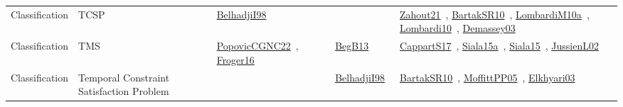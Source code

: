 {\begin{longtable}{lp{3cm}>{\raggedright\arraybackslash}p{6cm}>{\raggedright\arraybackslash}p{6cm}>{\raggedright\arraybackslash}p{8cm}}
Classification & TCSP & \href{../works/BelhadjiI98.pdf}{BelhadjiI98}~\cite{BelhadjiI98} &  & \href{../works/Zahout21.pdf}{Zahout21}~\cite{Zahout21}, \href{../works/BartakSR10.pdf}{BartakSR10}~\cite{BartakSR10}, \href{../works/LombardiM10a.pdf}{LombardiM10a}~\cite{LombardiM10a}, \href{../works/Lombardi10.pdf}{Lombardi10}~\cite{Lombardi10}, \href{../works/Demassey03.pdf}{Demassey03}~\cite{Demassey03}\\
Classification & TMS & \href{../works/PopovicCGNC22.pdf}{PopovicCGNC22}~\cite{PopovicCGNC22}, \href{../works/Froger16.pdf}{Froger16}~\cite{Froger16} & \href{../works/BegB13.pdf}{BegB13}~\cite{BegB13} & \href{../works/CappartS17.pdf}{CappartS17}~\cite{CappartS17}, \href{../works/Siala15a.pdf}{Siala15a}~\cite{Siala15a}, \href{../works/Siala15.pdf}{Siala15}~\cite{Siala15}, \href{../works/JussienL02.pdf}{JussienL02}~\cite{JussienL02}\\
Classification & Temporal Constraint Satisfaction Problem &  & \href{../works/BelhadjiI98.pdf}{BelhadjiI98}~\cite{BelhadjiI98} & \href{../works/BartakSR10.pdf}{BartakSR10}~\cite{BartakSR10}, \href{../works/MoffittPP05.pdf}{MoffittPP05}~\cite{MoffittPP05}, \href{../works/Elkhyari03.pdf}{Elkhyari03}~\cite{Elkhyari03}\\

\end{longtable}}
